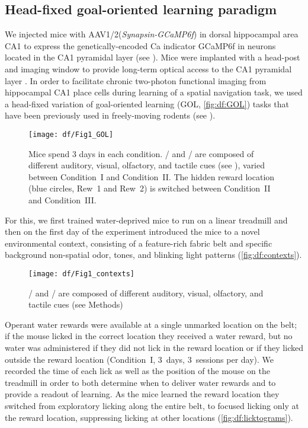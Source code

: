 \subsection{Head-fixed goal-oriented learning paradigm}
We injected mice with AAV1/2(\emph{Synapsin-GCaMP6f}) in dorsal hippocampal area CA1 to express the genetically-encoded Ca indicator GCaMP6f \citep{Chen2013} in neurons located in the CA1 pyramidal layer (see ).  Mice were implanted with a head-post and imaging window to provide long-term optical access to the CA1 pyramidal layer \citep{Danielson2016b, Kaifosh2013, Lovett-Barron2014}.  In order to facilitate chronic two-photon functional imaging from hippocampal CA1 place cells \citep{Danielson2016b, Dombeck2010} during learning of a spatial navigation task, we used a head-fixed variation of goal-oriented learning \citep{Danielson2016b} (GOL, \autoref{fig:df:GOL}) tasks that have been previously used in freely-moving rodents \citep{Dupret2010a} (see ).
\begin{figure}
	\centering
	\texttt{[image: df/Fig1\_GOL]}
	\caption[The three conditions of the GOL task]{Mice spend 3 days in each condition. \A/ and \Aprime/ are composed of different auditory, visual, olfactory, and tactile cues (see ), varied between Condition~I and Condition~II. The hidden reward location (blue circles, Rew~1 and Rew~2) is switched between Condition~II and Condition~III.}
	\label{fig:df:GOL}
\end{figure}
For this, we first trained water-deprived mice to run on a linear treadmill \citep{Danielson2016a, Danielson2016b, Royer2012} and then on the first day of the experiment introduced the mice to a novel environmental context, consisting of a feature-rich fabric belt and specific background non-spatial odor, tones, and blinking light patterns (\autoref{fig:df:contexts}).
\begin{figure}
	\centering
	\texttt{[image: df/Fig1\_contexts]}
	\caption[Components of the two distinct contexts used in the GOL task]{\A/ and \Aprime/ are composed of different auditory, visual, olfactory, and tactile cues (see Methods)}
	\label{fig:df:contexts}
\end{figure}
Operant water rewards were available at a single unmarked location on the belt; if the mouse licked in the correct location they received a water reward, but no water was administered if they did not lick in the reward location or if they licked outside the reward location (Condition~I, 3~days, 3~sessions per day).  We recorded the time of each lick as well as the position of the mouse on the treadmill in order to both determine when to deliver water rewards and to provide a readout of learning. As the mice learned the reward location they switched from exploratory licking along the entire belt, to focused licking only at the reward location, suppressing licking at other locations (\autoref{fig:df:licktograms}).
